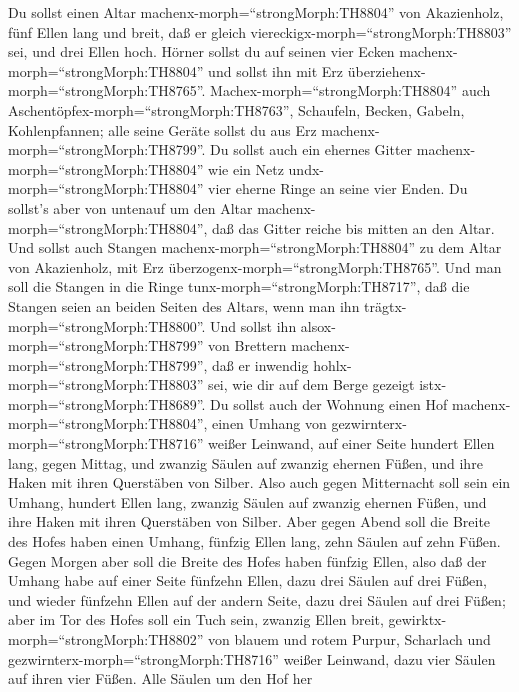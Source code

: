  Du sollst einen Altar machenx-morph=``strongMorph:TH8804''
von Akazienholz, fünf Ellen lang und breit, daß er gleich
viereckigx-morph=``strongMorph:TH8803'' sei, und drei Ellen hoch.
 Hörner sollst du auf seinen vier Ecken
machenx-morph=``strongMorph:TH8804'' und sollst ihn mit Erz
überziehenx-morph=``strongMorph:TH8765''. 
Machex-morph=``strongMorph:TH8804'' auch
Aschentöpfex-morph=``strongMorph:TH8763'', Schaufeln, Becken, Gabeln,
Kohlenpfannen; alle seine Geräte sollst du aus Erz
machenx-morph=``strongMorph:TH8799''.  Du sollst auch ein
ehernes Gitter machenx-morph=``strongMorph:TH8804'' wie ein Netz
undx-morph=``strongMorph:TH8804'' vier eherne Ringe an seine vier Enden.
 Du sollst's aber von untenauf um den Altar
machenx-morph=``strongMorph:TH8804'', daß das Gitter reiche bis mitten
an den Altar.  Und sollst auch Stangen
machenx-morph=``strongMorph:TH8804'' zu dem Altar von Akazienholz, mit
Erz überzogenx-morph=``strongMorph:TH8765''.  Und man soll
die Stangen in die Ringe tunx-morph=``strongMorph:TH8717'', daß die
Stangen seien an beiden Seiten des Altars, wenn man ihn
trägtx-morph=``strongMorph:TH8800''.  Und sollst ihn
alsox-morph=``strongMorph:TH8799'' von Brettern
machenx-morph=``strongMorph:TH8799'', daß er inwendig
hohlx-morph=``strongMorph:TH8803'' sei, wie dir auf dem Berge gezeigt
istx-morph=``strongMorph:TH8689''.  Du sollst auch der
Wohnung einen Hof machenx-morph=``strongMorph:TH8804'', einen Umhang von
gezwirnterx-morph=``strongMorph:TH8716'' weißer Leinwand, auf einer
Seite hundert Ellen lang, gegen Mittag,  und zwanzig Säulen
auf zwanzig ehernen Füßen, und ihre Haken mit ihren Querstäben von
Silber.  Also auch gegen Mitternacht soll sein ein Umhang,
hundert Ellen lang, zwanzig Säulen auf zwanzig ehernen Füßen, und ihre
Haken mit ihren Querstäben von Silber.  Aber gegen Abend
soll die Breite des Hofes haben einen Umhang, fünfzig Ellen lang, zehn
Säulen auf zehn Füßen.  Gegen Morgen aber soll die Breite
des Hofes haben fünfzig Ellen,  also daß der Umhang habe
auf einer Seite fünfzehn Ellen, dazu drei Säulen auf drei Füßen,
 und wieder fünfzehn Ellen auf der andern Seite, dazu drei
Säulen auf drei Füßen;  aber im Tor des Hofes soll ein Tuch
sein, zwanzig Ellen breit, gewirktx-morph=``strongMorph:TH8802'' von
blauem und rotem Purpur, Scharlach und
gezwirnterx-morph=``strongMorph:TH8716'' weißer Leinwand, dazu vier
Säulen auf ihren vier Füßen.  Alle Säulen um den Hof her
